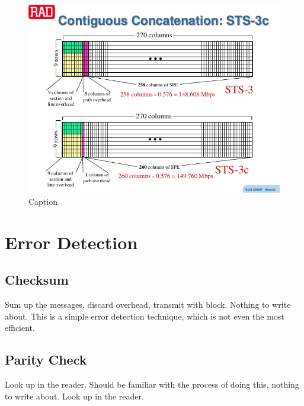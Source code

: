\documentclass[12pt]{book}
\begin{document}
\begin{figure}[H]
    \centering
    \includegraphics[width = \textwidth]{Pictures/sonet STS 3c vs STS 3.jpg}
    \caption{Caption}
    \label{fig:my_label}
\end{figure}

\section{Error Detection}
\subsection{Checksum}
Sum up the messages, discard overhead, transmit with block. Nothing to write about. This is a simple error detection technique, which is not even the most efficient.
\subsection{Parity Check}
Look up in the reader. Should be familiar with the process of doing this, nothing to write about. Look up in the reader.
\end{document}
